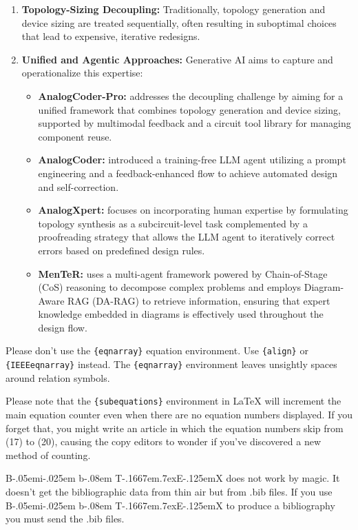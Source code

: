 \documentclass{ieeeaccess}
\def\BibTeX{{\rm B\kern-.05em{\sc i\kern-.025em b}\kern-.08em
    T\kern-.1667em\lower.7ex\hbox{E}\kern-.125emX}}
\begin{document}
\begin{enumerate}
    \item \textbf{Topology-Sizing Decoupling:} Traditionally, topology generation and device sizing are treated sequentially, often resulting in suboptimal choices that lead to expensive, iterative redesigns.
    \item \textbf{Unified and Agentic Approaches:} Generative AI aims to capture and operationalize this expertise:
        \begin{itemize}
            \item \textbf{AnalogCoder-Pro:} addresses the decoupling challenge by aiming for a unified framework that combines topology generation and device sizing, supported by multimodal feedback and a circuit tool library for managing component reuse.
            \item \textbf{AnalogCoder:} introduced a training-free LLM agent utilizing a prompt engineering and a feedback-enhanced flow to achieve automated design and self-correction.
            \item \textbf{AnalogXpert:} focuses on incorporating human expertise by formulating topology synthesis as a subcircuit-level task complemented by a proofreading strategy that allows the LLM agent to iteratively correct errors based on predefined design rules.
            \item \textbf{MenTeR:} uses a multi-agent framework powered by Chain-of-Stage (CoS) reasoning to decompose complex problems and employs Diagram-Aware RAG (DA-RAG) to retrieve information, ensuring that expert knowledge embedded in diagrams is effectively used throughout the design flow.
        \end{itemize}
\end{enumerate}

Please don't use the \verb|{eqnarray}| equation environment. Use
\verb|{align}| or \verb|{IEEEeqnarray}| instead. The \verb|{eqnarray}|
environment leaves unsightly spaces around relation symbols.

Please note that the \verb|{subequations}| environment in {\LaTeX}
will increment the main equation counter even when there are no
equation numbers displayed. If you forget that, you might write an
article in which the equation numbers skip from (17) to (20), causing
the copy editors to wonder if you've discovered a new method of
counting.

{\BibTeX} does not work by magic. It doesn't get the bibliographic
data from thin air but from .bib files. If you use {\BibTeX} to produce a
bibliography you must send the .bib files.
\end{document}
